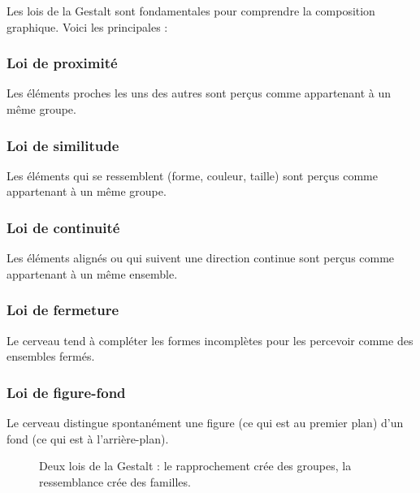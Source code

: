 Les lois de la Gestalt sont fondamentales pour comprendre la composition graphique. Voici les principales :

\subsubsection{Loi de proximité}

Les éléments proches les uns des autres sont perçus comme appartenant à un même groupe.

\subsubsection{Loi de similitude}

Les éléments qui se ressemblent (forme, couleur, taille) sont perçus comme appartenant à un même groupe.

\subsubsection{Loi de continuité}

Les éléments alignés ou qui suivent une direction continue sont perçus comme appartenant à un même ensemble.

\subsubsection{Loi de fermeture}

Le cerveau tend à compléter les formes incomplètes pour les percevoir comme des ensembles fermés.

\subsubsection{Loi de figure-fond}

Le cerveau distingue spontanément une figure (ce qui est au premier plan) d'un fond (ce qui est à l'arrière-plan).

\begin{figure}[ht]
\centering
{}
\caption{Deux lois de la Gestalt : le rapprochement crée des groupes, la ressemblance crée des familles.}
\end{figure}

